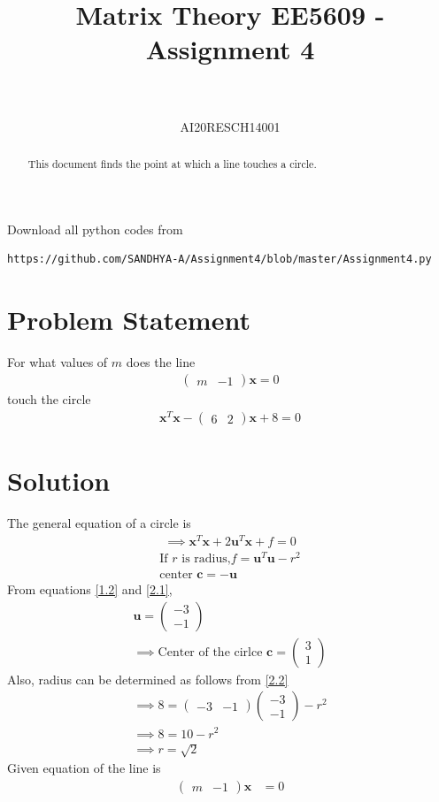 \documentclass[journal,12pt,twocolumn]{IEEEtran}
\let\vec\mathbf
\numberwithin{equation}{subsection}
\newcommand{\myvec}[1]{\ensuremath{\begin{pmatrix}#1\end{pmatrix}}}
\begin{document}
\title{Matrix Theory EE5609 - Assignment 4\\
}

\author{\\
 \\
AI20RESCH14001\\
 }

\maketitle
\begin{abstract}
 This document finds the point at which a line touches a circle.

\end{abstract}

Download all python codes from 
\begin{lstlisting}
https://github.com/SANDHYA-A/Assignment4/blob/master/Assignment4.py
\end{lstlisting}

\section{Problem Statement}
 For what values of $m$ does the line 
\begin{align}
\myvec{m &-1}\vec{x}=0 \label{1.1}
\end{align}
touch the circle
\begin{align}
\vec{x}^T\vec{x}-\myvec{6 & 2}\vec{x}+8 = 0 \label{1.2}
\end{align}

\section{Solution}
The general equation of a circle is 
\begin{align}
\implies \vec{x}^T\vec{x}+ 2\vec{u}^T\vec{x} + f = 0 \label{2.1}
\end{align}
\begin{align}
\text{If $r$ is radius,} f =\vec{u}^T\vec{u}-r^2  \label{2.2} \\  
  \text{center }\vec{c} =-\vec{u}
\end{align}
From equations \ref{1.2} and \ref{2.1},
\begin{align}
 \vec{u}  = \myvec{-3 \\ -1}\\
\implies \text{Center of the cirlce } \vec{c} = \myvec{3 \\ 1}
\end{align}
Also, radius can be determined as follows from \ref{2.2}
\begin{align}
  \implies 8=\myvec{-3&-1}\myvec{-3\\-1}-r^2\\
  \implies 8=10 -r^2\\
  \implies r=\sqrt{2}
\end{align}
Given equation of the line is
\begin{align}
\myvec{m&-1}\vec{x}&=0 
\end{align}
\end{document}

